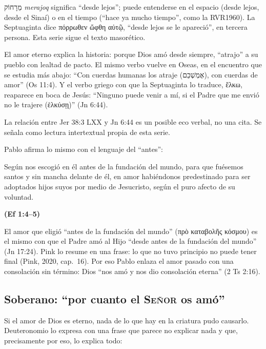 \documentclass[11pt,letterpaper]{article}
\newcommand{\heb}[1]{\mbox{\foreignlanguage{hebrew}{#1}}}
\newcommand{\grc}[1]{\foreignlanguage{ancientgreek}{#1}}
\newcommand{\SENOR}{\textsc{Señor}}
\newcommand{\fuente}[1]{\par\hfill{\upshape\bfseries\small\textcolor{azul}{#1}}}
\begin{document}
\begin{nota}
\heb{מֵרָחוֹק} \emph{merajoq} significa ``desde lejos''; puede entenderse en el espacio (desde lejos, desde el Sinaí) o en el tiempo (``hace ya mucho tiempo'', como la RVR1960). La Septuaginta dice \grc{πόρρωθεν ὤφθη αὐτῷ}, ``desde lejos se le apareció'', en tercera persona. Esta serie sigue el texto masorético.
\end{nota}

El amor eterno explica la historia: porque Dios amó desde siempre, ``atrajo'' a su pueblo con lealtad de pacto. El mismo verbo vuelve en Oseas, en el encuentro que se estudia más abajo: ``Con cuerdas humanas los atraje (\heb{אֶמְשְׁכֵם}), con cuerdas de amor'' (Os 11:4). Y el verbo griego con que la Septuaginta lo traduce, \grc{ἕλκω}, reaparece en boca de Jesús: ``Ninguno puede venir a mí, si el Padre que me envió no le trajere (\grc{ἑλκύσῃ})'' (Jn 6:44).

\begin{nota}[Precisión]
La relación entre Jer 38:3 LXX y Jn 6:44 es un posible eco verbal, no una cita. Se señala como lectura intertextual propia de esta serie.
\end{nota}

Pablo afirma lo mismo con el lenguaje del ``antes'':

\begin{cita}Según nos escogió en él antes de la fundación del mundo, para que fuésemos santos y sin mancha delante de él, en amor habiéndonos predestinado para ser adoptados hijos suyos por medio de Jesucristo, según el puro afecto de su voluntad.\fuente{(Ef 1:4--5)}\end{cita}

El amor que eligió ``antes de la fundación del mundo'' (\grc{πρὸ καταβολῆς κόσμου}) es el mismo con que el Padre amó al Hijo ``desde antes de la fundación del mundo'' (Jn 17:24). Pink lo resume en una frase: lo que no tuvo principio no puede tener final (Pink, 2020, cap.~16). Por eso Pablo enlaza el amor pasado con una consolación sin término: Dios ``nos amó y nos dio consolación eterna'' (2 Ts 2:16).

\subsection{Soberano: ``por cuanto el \SENOR{} os amó''}
Si el amor de Dios es eterno, nada de lo que hay en la criatura pudo causarlo. Deuteronomio lo expresa con una frase que parece no explicar nada y que, precisamente por eso, lo explica todo:
\end{document}
